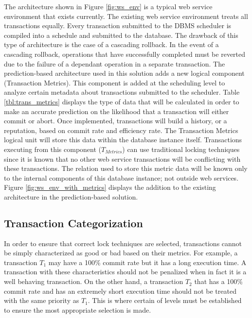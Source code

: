 \documentclass[conference]{IEEEtran}
\begin{document}
The architecture shown in Figure \ref{fig:ws_env} is a typical web service environment that exists currently. The existing web service environment treats all transactions equally. Every transaction submitted to the DBMS scheduler is compiled into a schedule and submitted to the database. The drawback of this type of architecture is the case of a cascading rollback. In the event of a cascading rollback, operations that have successfully completed must be reverted due to the failure of a dependant operation in a separate transaction. The prediction-based architecture used in this solution adds a new logical component (Transaction Metrics). This component is added at the scheduling level to analyze certain metadata about transactions submitted to the scheduler. Table \ref{tbl:trans_metrics} displays the type of data that will be calculated in order to make an accurate prediction on the likelihood that a transaction will either commit or abort. Once implemented, transactions will build a history, or a reputation, based on commit rate and efficiency rate. The Transaction Metrics logical unit will store this data within the database instance itself. Transactions executing from this component ($T_{Metrics}$) can use traditional locking techniques since it is known that no other web service transactions will be conflicting with these transactions. The relation used to store this metric data will be known only to the internal components of this database instance; not outside web services. Figure \ref{fig:ws_env_with_metrics} displays the addition to the existing architecture in the prediction-based solution.

\subsection{Transaction Categorization}

In order to ensure that correct lock techniques are selected, transactions cannot be simply characterized as good or bad based on their metrics. For example, a transaction $T_{1}$ may have a 100\% commit rate but it has a long execution time. A transaction with these characteristics should not be penalized when in fact it is a well behaving transaction. On the other hand, a transaction $T_{2}$ that has a 100\% commit rate and has an extremely short execution time should not be treated with the same priority as $T_{1}$. This is where certain of levels must be established to ensure the most appropriate selection is made.
\end{document}
